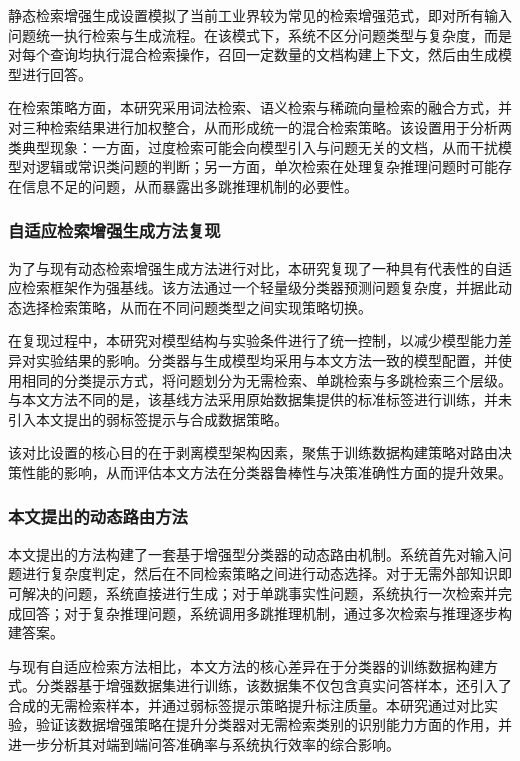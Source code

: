静态检索增强生成设置模拟了当前工业界较为常见的检索增强范式，即对所有输入问题统一执行检索与生成流程。在该模式下，系统不区分问题类型与复杂度，而是对每个查询均执行混合检索操作，召回一定数量的文档构建上下文，然后由生成模型进行回答。

在检索策略方面，本研究采用词法检索、语义检索与稀疏向量检索的融合方式，并对三种检索结果进行加权整合，从而形成统一的混合检索策略。该设置用于分析两类典型现象：一方面，过度检索可能会向模型引入与问题无关的文档，从而干扰模型对逻辑或常识类问题的判断；另一方面，单次检索在处理复杂推理问题时可能存在信息不足的问题，从而暴露出多跳推理机制的必要性。

\subsubsection{自适应检索增强生成方法复现}

为了与现有动态检索增强生成方法进行对比，本研究复现了一种具有代表性的自适应检索框架作为强基线。该方法通过一个轻量级分类器预测问题复杂度，并据此动态选择检索策略，从而在不同问题类型之间实现策略切换。

在复现过程中，本研究对模型结构与实验条件进行了统一控制，以减少模型能力差异对实验结果的影响。分类器与生成模型均采用与本文方法一致的模型配置，并使用相同的分类提示方式，将问题划分为无需检索、单跳检索与多跳检索三个层级。与本文方法不同的是，该基线方法采用原始数据集提供的标准标签进行训练，并未引入本文提出的弱标签提示与合成数据策略。

该对比设置的核心目的在于剥离模型架构因素，聚焦于训练数据构建策略对路由决策性能的影响，从而评估本文方法在分类器鲁棒性与决策准确性方面的提升效果。

\subsubsection{本文提出的动态路由方法}

本文提出的方法构建了一套基于增强型分类器的动态路由机制。系统首先对输入问题进行复杂度判定，然后在不同检索策略之间进行动态选择。对于无需外部知识即可解决的问题，系统直接进行生成；对于单跳事实性问题，系统执行一次检索并完成回答；对于复杂推理问题，系统调用多跳推理机制，通过多次检索与推理逐步构建答案。

与现有自适应检索方法相比，本文方法的核心差异在于分类器的训练数据构建方式。分类器基于增强数据集进行训练，该数据集不仅包含真实问答样本，还引入了合成的无需检索样本，并通过弱标签提示策略提升标注质量。本研究通过对比实验，验证该数据增强策略在提升分类器对无需检索类别的识别能力方面的作用，并进一步分析其对端到端问答准确率与系统执行效率的综合影响。

